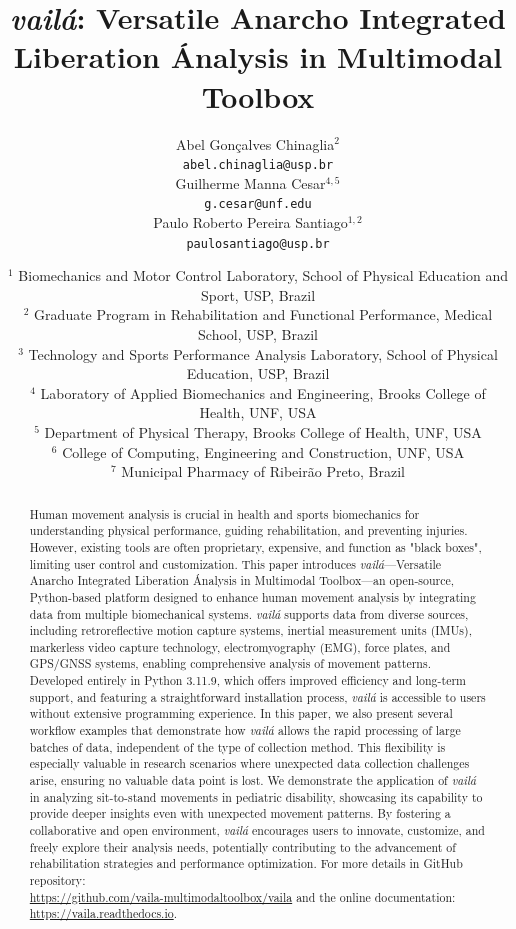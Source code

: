 \documentclass{article}
\title{\textit{vailá}: Versatile Anarcho Integrated Liberation Ánalysis in Multimodal Toolbox}
\author{
  Abel Gonçalves Chinaglia\orcidlink{0000-0002-6955-7187}$^{2}$ \\
  \texttt{abel.chinaglia@usp.br} \\
  \And
  Guilherme Manna Cesar\orcidlink{0000-0002-5596-9439}$^{4,5}$ \\
  \texttt{g.cesar@unf.edu} \\
  \And
  Paulo Roberto Pereira Santiago\orcidlink{0000-0002-9460-8847}$^{1,2}$ \\
  \texttt{paulosantiago@usp.br} \\
}
\date{
  $^1$ Biomechanics and Motor Control Laboratory, School of Physical Education and Sport, USP, Brazil \\
  $^2$ Graduate Program in Rehabilitation and Functional Performance, Medical School, USP, Brazil \\
  $^3$ Technology and Sports Performance Analysis Laboratory, School of Physical Education, USP, Brazil \\
  $^4$ Laboratory of Applied Biomechanics and Engineering, Brooks College of Health, UNF, USA \\
  $^5$ Department of Physical Therapy, Brooks College of Health, UNF, USA \\
  $^6$ College of Computing, Engineering and Construction, UNF, USA \\
  $^7$ Municipal Pharmacy of Ribeirão Preto, Brazil 
}
\begin{document}
\maketitle

\begin{abstract}
Human movement analysis is crucial in health and sports biomechanics for understanding physical performance, guiding rehabilitation, and preventing injuries. However, existing tools are often proprietary, expensive, and function as "black boxes", limiting user control and customization. This paper introduces \textit{vailá}—Versatile Anarcho Integrated Liberation Ánalysis in Multimodal Toolbox—an open-source, Python-based platform designed to enhance human movement analysis by integrating data from multiple biomechanical systems. \textit{vailá} supports data from diverse sources, including retroreflective motion capture systems, inertial measurement units (IMUs), markerless video capture technology, electromyography (EMG), force plates, and GPS/GNSS systems, enabling comprehensive analysis of movement patterns. Developed entirely in Python 3.11.9, which offers improved efficiency and long-term support, and featuring a straightforward installation process, \textit{vailá} is accessible to users without extensive programming experience. In this paper, we also present several workflow examples that demonstrate how \textit{vailá} allows the rapid processing of large batches of data, independent of the type of collection method. This flexibility is especially valuable in research scenarios where unexpected data collection challenges arise, ensuring no valuable data point is lost. We demonstrate the application of \textit{vailá} in analyzing sit-to-stand movements in pediatric disability, showcasing its capability to provide deeper insights even with unexpected  movement patterns. By fostering a collaborative and open environment, \textit{vailá} encourages users to innovate, customize, and freely explore their analysis needs, potentially contributing to the advancement of rehabilitation strategies and performance optimization.
For more details in GitHub repository: \\
\url{https://github.com/vaila-multimodaltoolbox/vaila} and the online documentation: \url{https://vaila.readthedocs.io}.
\end{abstract}

\end{document}
